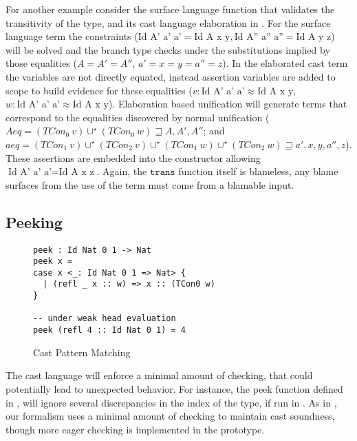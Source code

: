 For another example consider the surface language function that validates the transitivity of the \Id{} type, and its cast language elaboration in .
For the surface language term the constraints ($\text{Id A' a' a'}=\text{Id A x y},\text{Id A'' a'' a''}=\text{Id A y z}$) will be solved and the branch type checks under the substitutions implied by those equalities ($A=A'=A''$, $a'=x=y=a''=z$).
In the elaborated cast term the variables are not directly equated, instead assertion variables are added to scope to build evidence for these equalities ($v:\text{Id A' a' a'}\approx\text{Id A x y}$, $w:\text{Id A' a' a'}\approx\text{Id A x y}$).
Elaboration based unification will generate terms that correspond to the equalities discovered by normal unification 
  ($Aeq=\left(TCon_{0}\ v\right)\cup^{\star}\left(TCon_{0}\ w\right)\sqsupseteq A,A',A''$;
  and $aeq=\left(TCon_{1}\ v\right)\cup^{\star}\left(TCon_{2}\ v\right)\cup^{\star}\left(TCon_{1}\ w\right)\cup^{\star}\left(TCon_{2}\ w\right)\sqsupseteq a',x,y,a'',z$).
These assertions are embedded into the constructor allowing $\text{Id A' a' a'}=\text{Id A x z}$.
Again, the $\mathtt{trans}$ function itself is blameless, any blame surfaces from the use of the term must come from a blamable input.


\subsection{Peeking}


\begin{figure}
\begin{lstlisting}[basicstyle=\ttfamily\small]
peek : Id Nat 0 1 -> Nat
peek x =
case x <_: Id Nat 0 1 => Nat> {
  | (refl _ x :: w) => x :: (TCon0 w)
}

-- under weak head evaluation
peek (refl 4 :: Id Nat 0 1) = 4
\end{lstlisting}
\caption{Cast Pattern Matching}
\label{fig:cast-peek}
\end{figure}

The cast language will enforce a minimal amount of checking, that could potentially lead to unexpected behavior.
For instance, the peek function defined in , will ignore several discrepancies in the index of the \Id{} type, if run in \whnf{}.
As  in , our formalism uses a minimal amount of checking to maintain cast soundness, though more eager checking is implemented in the prototype.